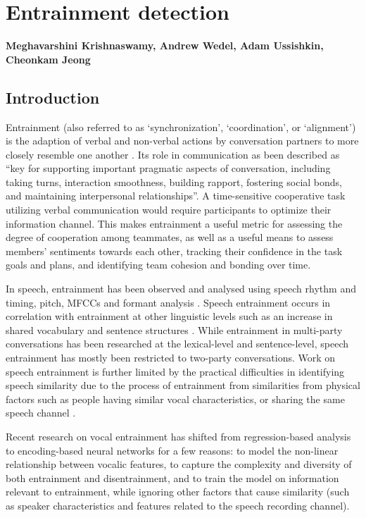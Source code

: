 \chapter{Entrainment detection}
\label{ch:entrainment}

\textbf{Meghavarshini Krishnaswamy, Andrew Wedel, Adam Ussishkin, Cheonkam Jeong} 
\section{Introduction}

    Entrainment (also referred to as `synchronization', `coordination', or `alignment') is the adaption of verbal and non-verbal actions by conversation partners to more closely resemble one another \parencite{borrie2014}. Its role in communication as been described as ``key for supporting important pragmatic aspects of conversation, including taking turns, interaction smoothness, building rapport, fostering social bonds, and maintaining interpersonal relationships''\parencite{borrie2019}. A time-sensitive cooperative task utilizing verbal communication would require participants to optimize their information channel. This makes entrainment a useful metric for assessing the degree of cooperation among teammates, as well as a useful means to assess members' sentiments towards each other, tracking their confidence in the task goals and plans, and identifying team cohesion and bonding over time.

    In speech, entrainment has been observed and analysed using speech rhythm and
    timing, pitch, MFCCs and formant analysis \parencite{reichel2018prosodic,borrie2019syncing}. Speech entrainment occurs in correlation with entrainment at other linguistic levels such as an increase in shared vocabulary and sentence structures \parencite{rahimi2017entrainment}. While entrainment in multi-party conversations has been researched at the lexical-level and sentence-level, speech entrainment has mostly been restricted to two-party conversations. Work on speech entrainment is further limited by the practical difficulties in identifying speech similarity due to the process of entrainment from similarities from physical factors such as people having similar vocal characteristics, or sharing the same speech channel \parencite{nasir2020}.

    Recent research on vocal entrainment has shifted from regression-based analysis to encoding-based neural networks for a few reasons: to model the non-linear relationship between vocalic features, to capture the complexity and diversity of both entrainment and disentrainment, and to train the model on information relevant to entrainment, while ignoring other factors that cause similarity (such as speaker characteristics and features related to the speech recording channel)\parencite{nasir2020}.


